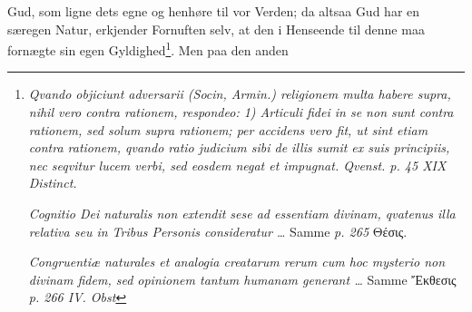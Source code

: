\documentclass[12pt]{book}
\begin{document}
Gud, som ligne dets egne og henhøre til vor Verden; da altsaa Gud har en
særegen Natur, erkjender Fornuften selv, at den i Henseende til denne maa
fornægte sin egen Gyldighed\footnote{\textit{Qvando objiciunt adversarii
(Socin, Armin.) religionem multa habere supra, nihil vero contra rationem,
respondeo: 1) Articuli fidei in se non sunt contra rationem, sed solum supra
rationem; per \emph{accidens} vero fit, ut sint etiam contra rationem, qvando
ratio judicium sibi de illis sumit ex suis principiis, nec seqvitur lucem
verbi, sed eosdem negat et impugnat. Qvenst. p. 45 XIX Distinct.}

\textit{Cognitio Dei naturalis non extendit sese ad essentiam divinam,
qvatenus illa relativa seu in Tribus Personis consideratur \ldots} Samme
\textit{p. 265} Θέσις.

\textit{Congruentiæ naturales et analogia creatarum rerum cum hoc mysterio
non divinam fidem, sed opinionem tantum humanam generant \ldots} Samme
Ἔκθεσις \textit{p. 266 IV. Obst}}. Men paa den anden
\end{document}
